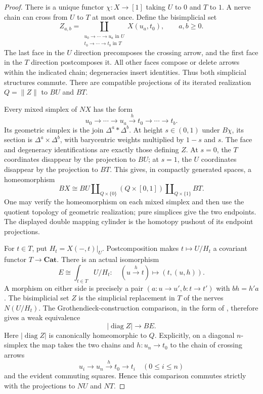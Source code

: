 \documentclass[11pt,a4paper]{article}
\theoremstyle{definition}
\theoremstyle{remark}
\newcommand{\Cat}{\mathbf{Cat}}
\newcommand{\diag}{\operatorname{diag}}
\begin{document}
\begin{proof}
There is a unique functor $\chi:X\to[1]$ taking $U$ to $0$ and $T$ to $1$. A nerve chain can cross from $U$ to $T$ at most once. Define the bisimplicial set
\[
 Z_{a,b}=
 \coprod_{\substack{u_0\to\cdots\to u_a\text{ in }U\\
                         t_0\to\cdots\to t_b\text{ in }T}}
 X(u_a,t_0),\qquad a,b\geq0.
\]
The last face in the $U$ direction precomposes the crossing arrow, and the first face in the $T$ direction postcomposes it. All other faces compose or delete arrows within the indicated chain; degeneracies insert identities. Thus both simplicial structures commute. There are compatible projections of its iterated realization $Q=\lVert Z\rVert$ to $BU$ and $BT$.

Every mixed simplex of $NX$ has the form
\[
 u_0\to\cdots\to u_a\xrightarrow{h}t_0\to\cdots\to t_b.
\]
Its geometric simplex is the join $\Delta^a*\Delta^b$. At height $s\in(0,1)$ under $B\chi$, its section is $\Delta^a\times\Delta^b$, with barycentric weights multiplied by $1-s$ and $s$. The face and degeneracy identifications are exactly those defining $Z$. At $s=0$, the $T$ coordinates disappear by the projection to $BU$; at $s=1$, the $U$ coordinates disappear by the projection to $BT$. This gives, in compactly generated spaces, a homeomorphism
\[
 BX\cong BU\amalg_{Q\times\{0\}}
 (Q\times[0,1])\amalg_{Q\times\{1\}}BT.
\]
One may verify the homeomorphism on each mixed simplex and then use the quotient topology of geometric realization; pure simplices give the two endpoints. The displayed double mapping cylinder is the homotopy pushout of its endpoint projections.

For $t\in T$, put $H_t=X(-,t)|_U$. Postcomposition makes $t\mapsto U/H_t$ a covariant functor $T\to\Cat$. There is an actual isomorphism
\[
 E\cong\int_{t\in T}U/H_t:
 \quad (u\xrightarrow h t)\longmapsto(t,(u,h)).
\]
A morphism on either side is precisely a pair $(a:u\to u',b:t\to t')$ with $bh=h'a$. The bisimplicial set $Z$ is the simplicial replacement in $T$ of the nerves $N(U/H_t)$. The Grothendieck-construction comparison, in the form of \citet[Theorem~1]{Cegarra2020}, therefore gives a weak equivalence
\[
 |\diag Z|\longrightarrow BE.
\]
Here $|\diag Z|$ is canonically homeomorphic to $Q$. Explicitly, on a diagonal $n$-simplex the map takes the two chains and $h:u_n\to t_0$ to the chain of crossing arrows
\[
 u_i\longrightarrow u_n\xrightarrow h t_0\longrightarrow t_i
 \quad(0\leq i\leq n)
\]
and the evident commuting squares. Hence this comparison commutes strictly with the projections to $NU$ and $NT$.


\end{proof}
\end{document}
